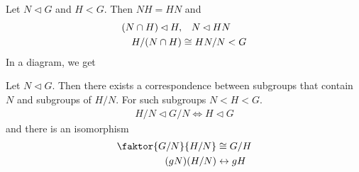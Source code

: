\begin{corollary}
  Let $N \lhd G$ and $H < G$. Then $NH = HN$ and
  \begin{align*}
    (N \cap H) \lhd  H, &\quad N \lhd HN\\
    H/(N \cap H) &\cong HN/N < G
  \end{align*}
  In a diagram, we get
  \begin{center}
  \end{center}

\end{corollary}


\begin{corollary}
  Let $N \lhd G$. Then there exists a correspondence between subgroups that contain $N$ and subgroups of $H/N$.
  For such subgroups $N < H < G$.
  \begin{align*}
    H/N \lhd  G/N \iff H \lhd G
  \end{align*}
  and there is an isomorphism
  \begin{align*}
    \faktor{G/N}{H/N} &\iso G/H\\
    (gN)(H/N) &\leftrightarrow gH
  \end{align*}
\end{corollary}



